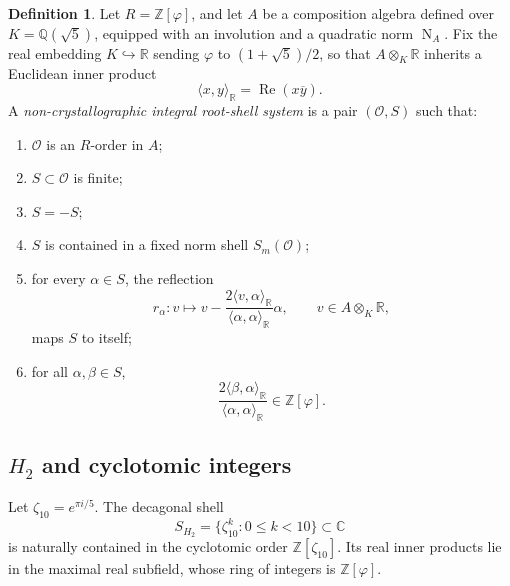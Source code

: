\documentclass[12pt,oneside,english]{amsart}
\numberwithin{equation}{section}
\numberwithin{figure}{section}
\numberwithin{table}{section}
\theoremstyle{plain}
\theoremstyle{definition}
\newtheorem{definition}[theorem]{Definition}
\theoremstyle{remark}
\newcommand{\ZZ}{\mathbb Z}
\newcommand{\RR}{\mathbb R}
\newcommand{\CC}{\mathbb C}
\newcommand{\KK}{\mathbb Q(\sqrt5)}
\newcommand{\Zphi}{\mathbb Z[\varphi]}
\newcommand{\Norm}{\operatorname{N}}
\newcommand{\Rea}{\operatorname{Re}}
\begin{document}
\begin{definition}
\label{def:nc-root-shell}
Let \(R=\Zphi\), and let \(A\) be a composition algebra defined over \(K=\KK\), equipped with an involution and a quadratic norm \(\Norm_A\). Fix the real embedding \(K\hookrightarrow\RR\) sending \(\varphi\) to \((1+\sqrt5)/2\), so that \(A\otimes_K\RR\) inherits a Euclidean inner product
\begin{equation}
\langle x,y\rangle_{\RR}=\Rea(x\overline{y}).
\label{eq:real-inner-product}
\end{equation}
A \emph{non-crystallographic integral root-shell system} is a pair \((\mathcal O,S)\) such that:
\begin{enumerate}
\item \(\mathcal O\) is an \(R\)-order in \(A\);
\item \(S\subset \mathcal O\) is finite;
\item \(S=-S\);
\item \(S\) is contained in a fixed norm shell \(S_m(\mathcal O)\);
\item for every \(\alpha\in S\), the reflection
\begin{equation}
r_\alpha\colon v\longmapsto v-\frac{2\langle v,\alpha\rangle_{\RR}}{\langle\alpha,\alpha\rangle_{\RR}}\alpha,
\qquad v\in A\otimes_K\RR,
\label{eq:nc-reflection}
\end{equation}
maps \(S\) to itself;
\item for all \(\alpha,\beta\in S\),
\begin{equation}
\frac{2\langle \beta,\alpha\rangle_{\RR}}{\langle\alpha,\alpha\rangle_{\RR}}\in\Zphi.
\label{eq:golden-cartan}
\end{equation}
\end{enumerate}
\end{definition}

\subsection{\texorpdfstring{\(H_2\)}{H2} and cyclotomic integers}

Let \(\zeta_{10}=e^{\pi i/5}\). The decagonal shell
\begin{equation}
S_{H_2}=\{\zeta_{10}^k:0\leq k<10\}\subset\CC
\label{eq:h2-cyclotomic-shell}
\end{equation}
is naturally contained in the cyclotomic order \(\ZZ[\zeta_{10}]\). Its real inner products lie in the maximal real subfield, whose ring of integers is \(\Zphi\).
\end{document}

